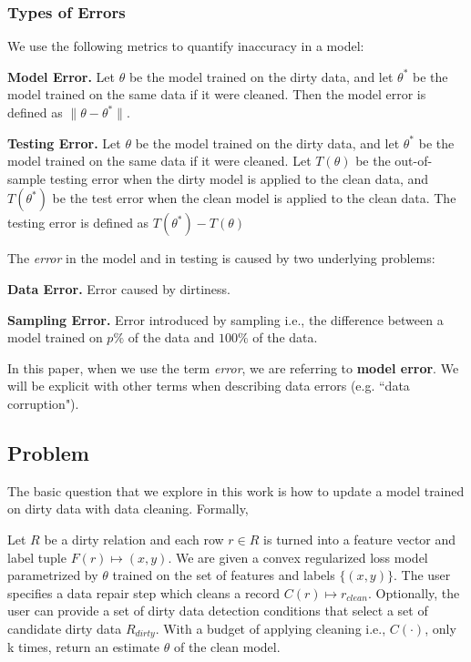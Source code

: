 \subsubsection{Types of Errors}
We use the following metrics to quantify inaccuracy in a model:

\vspace{0.25em}

\noindent\textbf{Model Error. } Let $\theta$ be the model trained on the dirty data, and let $\theta^*$ be the model trained on the same data if it were cleaned. Then the model error is defined as $\|\theta - \theta^*\|$.

\vspace{0.25em}

\noindent\textbf{Testing Error. } Let $\theta$ be the model trained on the dirty data, and let $\theta^*$ be the model trained on the same data if it were cleaned. Let $T(\theta)$ be the out-of-sample testing error when the dirty model is applied to the clean data, and $T(\theta^*)$ be the test error when the clean model is applied to the clean data. The testing error is defined as $T(\theta^*) - T(\theta)$

\vspace{0.5em}

\noindent The \emph{error} in the model and in testing is caused by two underlying problems:

\vspace{0.25em}

\noindent\textbf{Data Error. } Error caused by dirtiness.

\vspace{0.25em}

\noindent\textbf{Sampling Error. } Error introduced by sampling i.e., the difference between a model trained on $p\%$ of the data and $100\%$ of the data.

\vspace{0.25em}

In this paper, when we use the term \emph{error}, we are referring to \textbf{model error}.
We will be explicit with other terms when describing data errors (e.g. ``data corruption").

\subsection{\sys Problem}
The basic question that we explore in this work is how to update a model trained on dirty data with data cleaning. Formally,

\begin{problem}\label{activeclean}\sloppy
Let $R$ be a dirty relation and each row $r \in R$ is 
turned into a feature vector and label tuple $F(r) \mapsto (x,y)$.
We are given a convex regularized loss model parametrized
by $\theta$ trained on the set of features and labels $\{(x,y)\}$.
The user specifies a data repair step which cleans a record 
$C(r) \mapsto r_{clean}$.
Optionally, the user can provide a set of dirty data detection conditions that select 
a set of candidate dirty data $R_{dirty}$.
With a budget of applying cleaning i.e., $C(\cdot)$, only k times, return an estimate $\hat{\theta}$ of the clean model.
\end{problem}

